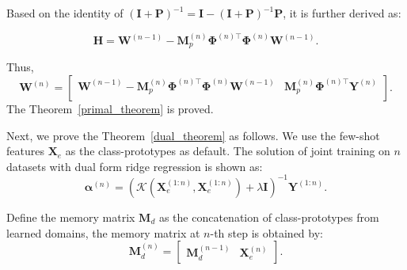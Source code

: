Based on the identity of $\left(\mathbf{I} + \mathbf{P}\right)^{-1}=\mathbf{I} - \left(\mathbf{I} + \mathbf{P}\right)^{-1}\mathbf{P}$, it is further derived as:

\begin{equation}
    \mathbf{H} = 
    \mathbf{W}^{\left(n-1\right)} - \mathbf{M}_p^{(n)}\mathbf{\Phi}^{(n)\top}
    \mathbf{\Phi}^{(n)}\mathbf{W}^{\left(n-1\right)}. 
\end{equation}

Thus, 
\begin{equation}
    \mathbf{W}^{\left(n\right)} = 
\begin{bmatrix}
    {\mathbf{W}^{\left(n-1\right)}- \mathbf{M}_p^{\left(n\right)} \mathbf{\Phi}^{\left(n\right)\top}\mathbf{\Phi}^{\left(n\right)}\mathbf{W}^{\left(n-1\right)}} & \mathbf{M}_p^{\left(n\right)}\mathbf{\Phi}^{\left(n\right)\top}\mathbf{Y}^{\left(n\right)} \\
\end{bmatrix}.
\end{equation}
The Theorem~\ref{primal_theorem} is proved.

Next, we prove the Theorem~\ref{dual_theorem} as follows. We use the few-shot features $\mathbf{X}_e$ as the class-prototypes as default. The solution of joint training on $n$ datasets with dual form ridge regression is shown as:
\begin{equation}
\label{eqn:dual_joint}
\boldsymbol{\alpha}^{\left(n\right)} = \left(\mathcal{K}\left(\mathbf{X}_e^{\left(1:n\right)}, \mathbf{X}_e^{\left(1:n\right)}\right) + \lambda \mathbf{I}\right)^{-1}\mathbf{Y}^{\left(1:n\right)}.
\end{equation}

Define the memory matrix $\mathbf{M}_d$ as the concatenation of class-prototypes from learned domains, the memory matrix at $n$-th step is obtained by:
\begin{equation}
    \mathbf{M}_d^{\left(n\right)} = 
    \begin{bmatrix} 
    \mathbf{M}_d^{\left(n-1\right)} & \mathbf{X}_e^{\left(n\right)} 
    \end{bmatrix}.
\end{equation}

